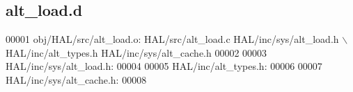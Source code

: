 \subsection{alt\+\_\+load.\+d}
\label{alt__load_8d_source}

\begin{DoxyCode}
00001 obj/HAL/src/alt_load.o: HAL/src/alt_load.c HAL/inc/sys/alt_load.h \(\backslash\)
 HAL/inc/alt\_types.h HAL/inc/sys/alt\_cache.h
00002 
00003 HAL/inc/sys/alt_load.h:
00004 
00005 HAL/inc/alt\_types.h:
00006 
00007 HAL/inc/sys/alt\_cache.h:
00008 \end{DoxyCode}
